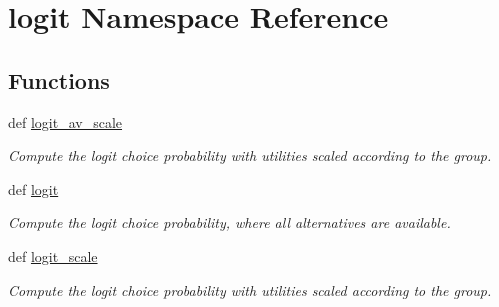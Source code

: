 \hypertarget{namespacelogit}{\section{logit Namespace Reference}
\label{namespacelogit}
}
\subsection*{Functions}
\begin{DoxyCompactItemize}
\item 
def \hyperlink{group__models_gaa1fe1d39643113961336001852bd9847}{logit\+\_\+av\+\_\+scale}
\begin{DoxyCompactList}\small\item\em Compute the logit choice probability with utilities scaled according to the group. \end{DoxyCompactList}\item 
def \hyperlink{group__models_gaa78a7685299279e172947a45f3b31a8f}{logit}
\begin{DoxyCompactList}\small\item\em Compute the logit choice probability, where all alternatives are available. \end{DoxyCompactList}\item 
def \hyperlink{group__models_gaa9c3a2702105789a7f4e7c56128072df}{logit\+\_\+scale}
\begin{DoxyCompactList}\small\item\em Compute the logit choice probability with utilities scaled according to the group. \end{DoxyCompactList}\end{DoxyCompactItemize}
